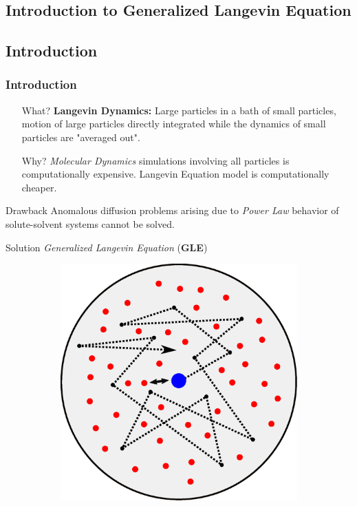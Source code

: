 \documentclass[a4paper,10pt]{beamer}
\begin{document}
	\begin{frame}
		\small
		\section{Introduction to Generalized Langevin Equation}
		\subsection{Introduction}
		\frametitle{Introduction}
		\begin{itemize}
			\item[What?] {\textbf{Langevin Dynamics:} Large particles in a bath of small particles, motion of large particles directly integrated while the dynamics of small particles are "averaged out".}
			\item[Why?] {\textit{Molecular Dynamics} simulations involving all particles is computationally expensive. Langevin Equation model is computationally cheaper.}
		\end{itemize}
		\begin{minipage}{0.35\linewidth}
			\footnotesize
			\begin{alertblock}{Drawback}
				Anomalous diffusion problems arising due to \textit{Power Law} behavior of solute-solvent systems cannot be solved.
			\end{alertblock}
			\begin{exampleblock}{Solution}
				\textit{Generalized Langevin Equation} (\textbf{GLE})
			\end{exampleblock}
		\end{minipage}
		\hfill
		\begin{minipage}{0.6\linewidth}
			\centering
			\begin{figure}[H]
				\begin{subfigure}[b]{0.45\linewidth}
					\includegraphics[width=\linewidth]{./Plots/HeatBath.eps}

\end{subfigure}
\end{figure}
\end{minipage}
\end{frame}
\end{document}
